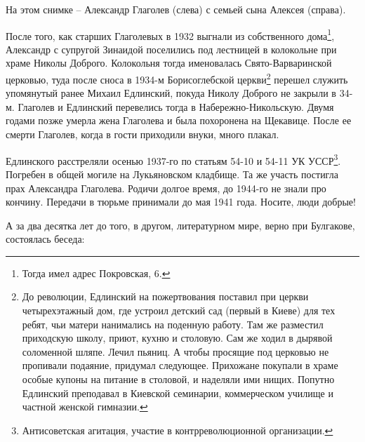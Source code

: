 На этом снимке – Александр Глаголев (слева) с семьей сына Алексея (справа).

После того, как старших Глаголевых в 1932 выгнали из собственного дома\footnote{Тогда имел адрес Покровская, 6.}, Александр с супругой Зинаидой поселились под лестницей в колокольне при храме Николы Доброго. Колокольня тогда именовалась Свято-Варваринской церковью, туда после сноса в 1934-м Борисоглебской церкви\footnote{До революции, Едлинский на пожертвования поставил при церкви четырехэтажный дом, где устроил детский сад (первый в Киеве) для тех ребят, чьи матери нанимались на поденную работу. Там же разместил приходскую школу, приют, кухню и столовую. Сам же ходил в дырявой соломенной шляпе. Лечил пьяниц. А чтобы просящие под церковью не пропивали подаяние, придумал следующее. Прихожане покупали в храме особые купоны на питание в столовой, и наделяли ими нищих. Попутно Едлинский преподавал в Киевской семинарии, коммерческом училище и частной женской гимназии.} перешел служить упомянутый ранее Михаил Едлинский, покуда Николу Доброго не закрыли в 34-м. Глаголев и Едлинский перевелись тогда в Набережно-Никольскую. Двумя годами позже умерла жена Глаголева и была похоронена на Щекавице. После ее смерти Глаголев, когда в гости приходили внуки, много плакал. 

Едлинского расстреляли осенью 1937-го по статьям 54-10 и 54-11 УК УССР\footnote{Антисоветская агитация, участие в контрреволюционной организации.}. Погребен в общей могиле на Лукьяновском кладбище. Та же участь постигла прах Александра Глаголева. Родичи долгое время, до 1944-го не знали про кончину. Передачи в тюрьме принимали до мая 1941 года. Носите, люди добрые!

А за два десятка лет до того, в другом, литературном мире, верно при Булгакове, состоялась беседа:

